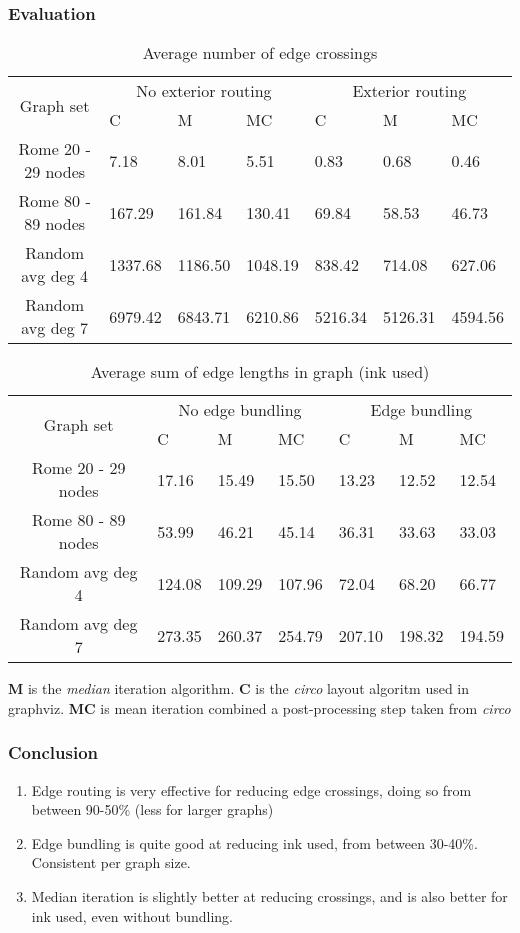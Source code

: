 \documentclass[12pt]{beamer}
\begin{document}
\begin{frame}
	\frametitle{Evaluation}
		
	\scriptsize {
		\begin{table}
		\centering
		\begin{tabular}{|c|lll|lll|} \hline
		\multirow{2}{*}{Graph set} & \multicolumn{3}{c|}{No exterior routing} & \multicolumn{3}{c|}{Exterior routing} \\ \cline{2-7}
					& C & M & MC & C & M & MC \\ \hline
		Rome 20 - 29 nodes & 7.18 & 8.01 & 5.51 & 0.83 & 0.68 & 0.46 \\
		Rome 80 - 89 nodes & 167.29 & 161.84 & 130.41 & 69.84 & 58.53 & 46.73 \\
		Random avg deg 4 & 1337.68 & 1186.50 & 1048.19 & 838.42 & 714.08 & 627.06 \\
		Random avg deg 7 & 6979.42 & 6843.71 & 6210.86 & 5216.34 & 5126.31 & 4594.56 \\ \hline
		\end{tabular}
		\caption{Average number of edge crossings}
	\end{table}
	}	
	
	\scriptsize {
	\begin{table}
	\centering
	\begin{tabular}{|c|lll|lll|} \hline
		\multirow{2}{*}{Graph set} & \multicolumn{3}{c|}{No edge bundling} & \multicolumn{3}{c|}{Edge bundling} \\ \cline{2-7}
					& C & M & MC & C & M & MC \\ \hline
		Rome 20 - 29 nodes & 17.16 & 15.49 & 15.50 & 13.23 & 12.52 & 12.54 \\
		Rome 80 - 89 nodes & 53.99 & 46.21 & 45.14 & 36.31 & 33.63 & 33.03 \\
		Random avg deg 4 & 124.08 & 109.29 & 107.96 & 72.04 & 68.20 & 66.77 \\
		Random avg deg 7 & 273.35 & 260.37 & 254.79 & 207.10 & 198.32 & 194.59 \\ \hline
	\end{tabular}
	\caption{Average sum of edge lengths in graph (ink used)}
	\end{table}
	}
	\textbf{M} is the \emph{median} iteration algorithm. \textbf{C} is the \emph{circo} layout algoritm used in graphviz. \textbf{MC} is mean iteration combined a post-processing step taken from \emph{circo}
\end{frame}	

\begin{frame}
	\frametitle{Conclusion}
	\begin{enumerate}
		\item Edge routing is very effective for reducing edge crossings, doing so from between 90-50\% (less for larger graphs)
		\item Edge bundling is quite good at reducing ink used, from between 30-40\%. Consistent per graph size.
		\item Median iteration is slightly better at reducing crossings, and is also better for ink used, even without bundling.
	\end{enumerate}
\end{frame}
\end{document}
